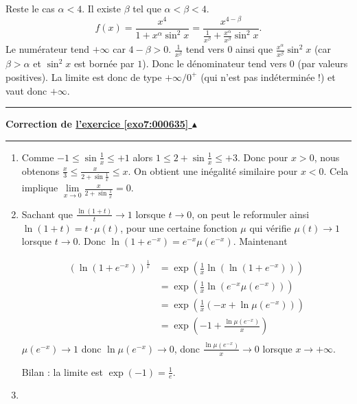 \documentclass[11pt,a4paper]{article}
\renewcommand{\le}{\leqslant} \renewcommand{\leq}{\leqslant}
\newcounter{exo}
\newcommand{\correction}[1]{\hypertarget{cor7:#1}{}\label{cor7:#1}{\bf Correction de \hyperlink{exo7:#1}{l'exercice \ref{exo7:#1} $\blacktriangle$}}\vspace{1mm}\hrule\vspace{1mm}}
\newcommand{\fincorrection}{\vspace{1mm}\hrule\vspace*{7mm}}
\begin{document}
\begin{enumerate}
Reste le cas $\alpha < 4$. Il existe $\beta$ tel que
$\alpha < \beta < 4$. 
$$f(x)= \frac {x^4}{1+x^\alpha \sin^2 x}= \frac {x^{4-\beta}}{\frac 1 {x^\beta} +\frac{x^\alpha}{x^\beta} \sin^2 x}.$$
Le num\'erateur tend $+\infty$ car $4-\beta >0$.
$\frac 1 {x^\beta}$ tend vers $0$ ainsi que $\frac{x^{\alpha}}{x^\beta} \sin^2 x$ (car $\beta > \alpha$ et $\sin^2 x$ est born\'ee par $1$). Donc le d\'enominateur tend vers $0$ (par valeurs positives). La limite est donc de type $+\infty / 0^+$ (qui n'est pas ind\'etermin\'ee !) et vaut donc $+\infty$.
\end{enumerate}
\fincorrection
\correction{000635}
\begin{enumerate}
 \item Comme $-1 \le \sin \frac 1x \le +1$ alors $1 \le 2 + \sin \frac 1x \le +3$.
Donc pour $x>0$, nous obtenons $\frac x3 \le \frac{x}{2+\sin \frac{1}{x}} \le x$.
On obtient une inégalité similaire pour $x<0$.
Cela implique $\lim\limits_{x\rightarrow 0}\frac{x}{2+\sin \frac{1}{x}} = 0$.

 \item Sachant que $\frac{\ln (1+t)}{t} \to 1$ lorsque $t \to 0$, on peut le reformuler
ainsi $\ln(1+t) = t \cdot \mu(t)$, pour une certaine fonction $\mu$ qui vérifie $\mu(t) \to 1$ lorsque $t\to 0$.
Donc $\ln (1+e^{-x}) = e^{-x} \mu(e^{-x})$.
Maintenant 

\begin{align*}
(\ln (1+e^{-x}))^{\frac{1}{x}} 
  &= \exp \left(\frac{1}{x} \ln\left( \ln (1+e^{-x}) \right)  \right) \\
  &= \exp \left(\frac{1}{x} \ln \left( e^{-x} \mu(e^{-x}) \right)  \right) \\
  &= \exp \left(\frac{1}{x} \left( -x + \ln \mu(e^{-x}) \right)  \right) \\
  &= \exp \left( -1 + \frac{\ln \mu(e^{-x})}{x}  \right) \\
\end{align*}
$\mu(e^{-x}) \to 1$ donc $\ln\mu(e^{-x}) \to 0$, donc $\frac{\ln \mu(e^{-x})}{x} \to 0$ lorsque $x \to +\infty$.

Bilan : la limite est $\exp(-1)=\frac 1 e$.
 \item



\end{enumerate}
\end{document}
